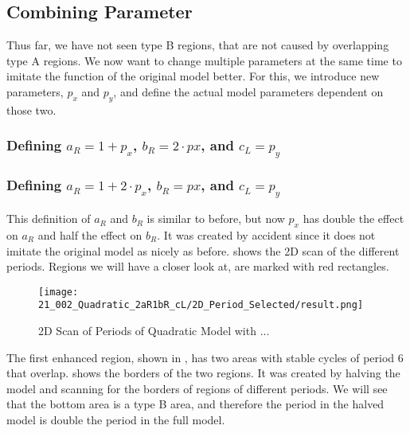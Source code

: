 \subsection{Combining Parameter}

Thus far, we have not seen type B regions, that are not caused by overlapping type A regions.
We now want to change multiple parameters at the same time to imitate the function of the original model better.
For this, we introduce new parameters, $p_x$ and $p_y$, and define the actual model parameters dependent on those two.

\subsubsection{Defining $a_R = 1 + p_x$, $b_R = 2 \cdot px$, and $c_L = p_y$}


\subsubsection{Defining $a_R = 1 + 2 \cdot p_x$, $b_R = px$, and $c_L = p_y$}

This definition of $a_R$ and $b_R$ is similar to before, but now $p_x$ has double the effect on $a_R$ and half the effect on $b_R$.
It was created by accident since it does not imitate the original model as nicely as before.
 shows the 2D scan of the different periods.
Regions we will have a closer look at, are marked with red rectangles.

\begin{figure}
    \centering
    \texttt{[image: 21\_002\_Quadratic\_2aR1bR\_cL/2D\_Period\_Selected/result.png]}
    \caption{2D Scan of Periods of Quadratic Model with ...}
    \label{fig:quadratic.full.2aR1bR_cL.2d.full}
\end{figure}

The first enhanced region, shown in , has two areas with stable cycles of period 6 that overlap.
 shows the borders of the two regions.
It was created by halving the model and scanning for the borders of regions of different periods.
We will see that the bottom area is a type B area, and therefore the period in the halved model is double the period in the full model.

